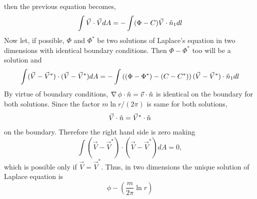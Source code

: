 \begin{itemize}
then the previous equation becomes,
\[
\int\vec{V}\cdot\vec{V}dA = -\int(\Phi - C)\vec{V}\cdot\hat{n}_1 dl
\]
Now let, if possible, $\Phi$ and $\Phi^\ast$ be two solutions of Laplace's equation in two dimensions with identical boundary conditions. Then $\Phi - \Phi^\ast$ too will be a solution 
and
\[
\int(\vec{V} - \vec{V}^\ast)\cdot(\vec{V} - \vec{V}^\ast)dA = -\int\left((\Phi - \Phi^\ast) - (C - C^\ast)\right)(\vec{V} - \vec{V}^\ast)\cdot\hat{n}_1 dl
\]
By virtue of boundary conditions, $\operatorname{\nabla}{\phi}\cdot\hat{n} = \vec{v}\cdot\hat{n}$ is identical on the boundary for both solutions. Since the factor $m\ln r/(2\pi)$ is same for both solutions,
\[
\vec{V}\cdot\hat{n} = \vec{V}^\ast\cdot\hat{n}
\]
on the boundary. Therefore the right hand side is zero making
\[
\int(\vec{V} - \vec{V}^\ast)\cdot(\vec{V} - \vec{V}^\ast)dA = 0,
\]
which is possible only if $\vec{V} = \vec{V}^\ast$. Thus, in two dimensions the unique solution of Laplace equation is
\[
\phi - \left(\frac{m}{2\pi}\ln r\right) 
\]
\end{itemize}

